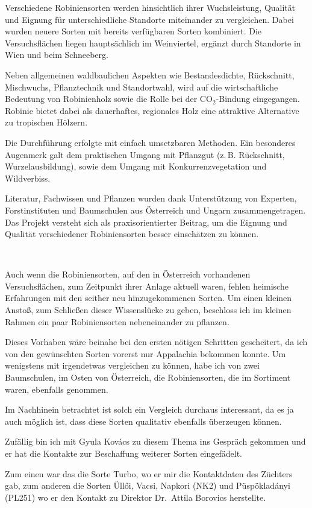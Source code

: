 \documentclass[twocolumn]{scrartcl}
\makeatletter
\newcommand{\summary}[1]{%
  \par %
  {\small\sffamily
    \noindent #1\par}
  \vspace{-0.4em}
  \noindent\makebox[\linewidth]{\rule{0.33\linewidth}{0.4pt}}\\[-1.2em]
  \@afterindentfalse\@afterheading
}
\makeatother
\begin{document}
\summary{Verschiedene Robiniensorten werden hinsichtlich ihrer
  Wuchsleistung, Qualität und Eignung für unterschiedliche Standorte
  miteinander zu vergleichen. Dabei wurden neuere Sorten mit bereits
  verfügbaren Sorten kombiniert. Die Versuchsflächen liegen
  hauptsächlich im Weinviertel, ergänzt durch Standorte in Wien und
  beim Schneeberg.

Neben allgemeinen waldbaulichen Aspekten wie Bestandesdichte,
Rückschnitt, Mischwuchs, Pflanztechnik und Standortwahl, wird auf die
wirtschaftliche Bedeutung von Robinienholz sowie die Rolle bei der
CO$_2$-Bindung eingegangen. Robinie bietet dabei als dauerhaftes,
regionales Holz eine attraktive Alternative zu tropischen Hölzern.

Die Durchführung erfolgte mit einfach umsetzbaren Methoden. Ein
besonderes Augenmerk galt dem praktischen Umgang mit Pflanzgut
(z.\,B. Rückschnitt, Wurzelausbildung), sowie dem Umgang mit
Konkurrenzvegetation und Wildverbiss.

Literatur, Fachwissen und Pflanzen wurden dank Unterstützung von
Experten, Forstinstituten und Baumschulen aus Österreich und Ungarn
zusammengetragen. Das Projekt versteht sich als praxisorientierter
Beitrag, um die Eignung und Qualität verschiedener Robiniensorten
besser einschätzen zu können.}

Auch wenn die Robiniensorten, auf den in Österreich vorhandenen
Versuchsflächen, zum Zeitpunkt ihrer Anlage aktuell waren, fehlen
heimische Erfahrungen mit den seither neu hinzugekommenen Sorten.  Um
einen kleinen Anstoß, zum Schließen dieser Wissenslücke zu geben,
beschloss ich im kleinen Rahmen ein paar Robiniensorten nebeneinander
zu pflanzen.

Dieses Vorhaben wäre beinahe bei den ersten nötigen Schritten
gescheitert, da ich von den gewünschten Sorten vorerst nur Appalachia
bekommen konnte. Um wenigstens mit irgendetwas vergleichen zu können,
habe ich von zwei Baumschulen, im Osten von Österreich, die
Robiniensorten, die im Sortiment waren, ebenfalls genommen.

Im Nachhinein betrachtet ist solch ein Vergleich durchaus interessant,
da es ja auch möglich ist, dass diese Sorten qualitativ ebenfalls
überzeugen können.

Zufällig bin ich mit Gyula Kovács zu diesem Thema ins Gespräch
gekommen und er hat die Kontakte zur Beschaffung weiterer Sorten
eingefädelt.

Zum einen war das die Sorte Turbo, wo er mir die Kontaktdaten des
Züchters gab, zum anderen die Sorten Üllői, Vacsi, Napkori (NK2) und
Püspökladányi (PL251) wo er den Kontakt zu Direktor Dr.~Attila
Borovics herstellte.
\end{document}
